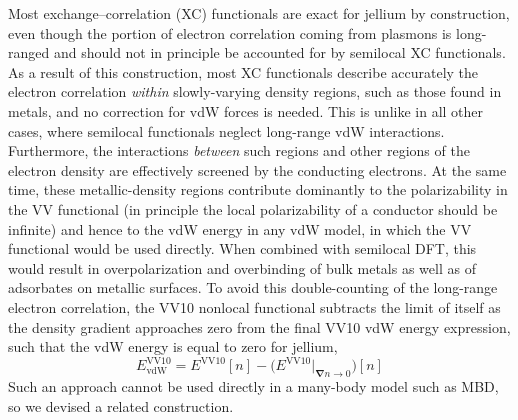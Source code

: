 Most exchange--correlation (XC) functionals are exact for jellium by construction, even though the portion of electron correlation coming from plasmons is long-ranged and should not in principle be accounted for by semilocal XC functionals.
As a result of this construction, most XC functionals describe accurately the electron correlation \emph{within} slowly-varying density regions, such as those found in metals, and no correction for vdW forces is needed.
This is unlike in all other cases, where semilocal functionals neglect long-range vdW interactions.
Furthermore, the interactions \emph{between} such regions and other regions of the electron density are effectively screened by the conducting electrons.
At the same time, these metallic-density regions contribute dominantly to the polarizability in the VV functional (in principle the local polarizability of a conductor should be infinite) and hence to the vdW energy in any vdW model, in which the VV functional would be used directly.
When combined with semilocal DFT, this would result in overpolarization and overbinding of bulk metals as well as of adsorbates on metallic surfaces.
To avoid this double-counting of the long-range electron correlation, the VV10 nonlocal functional subtracts the limit of itself as the density gradient approaches zero from the final VV10 vdW energy expression, such that the vdW energy is equal to zero for jellium,
\begin{equation}
  E_\text{vdW}^\text{VV10} = E^\text{VV10}[n]-\big(E^\text{VV10}\big|_{\boldsymbol\nabla n\rightarrow0}\big)[n]
\end{equation}
Such an approach cannot be used directly in a many-body model such as MBD, so we devised a related construction.

